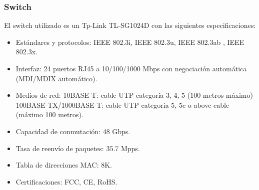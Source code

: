 \subsubsection{Switch}
El switch utilizado es un Tp-Link TL-SG1024D con las siguientes especificaciones:
\begin{itemize}
	\item Estándares y protocolos: IEEE 802.3i, IEEE 802.3u, IEEE 802.3ab , IEEE 802.3x.
	\item Interfaz: 24 puertos RJ45 a 10/100/1000 Mbps con negociación automática
	(MDI/MDIX automático).
	\item Medios de red: 10BASE-T: cable UTP categoría 3, 4, 5 (100 metros máximo)
	100BASE-TX/1000BASE-T: cable UTP categoría 5, 5e o above cable (máximo 100 metros).
	\item Capacidad de conmutación: 48 Gbps.
	\item Tasa de reenvío de paquetes: 35.7 Mpps.
	\item Tabla de direcciones MAC: 8K.
	\item Certificaciones: FCC, CE, RoHS.
\end{itemize}
